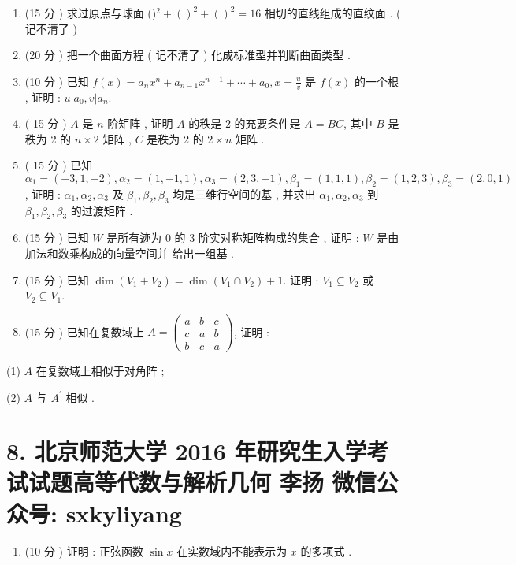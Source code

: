 \documentclass[10pt]{article}
\begin{document}
{\begin{enumerate}
  \item (15  分 )  求过原点与球面  ()$^{2}+()^{2}+()^{2}=16$  相切的直线组成的直纹面 . ( 记不清了 )

  \item (20  分 )  把一个曲面方程  ( 记不清了 )  化成标准型并判断曲面类型 .

  \item (10  分 )  已知  $f(x)=a_{n} x^{n}+a_{n-1} x^{n-1}+\cdots+a_{0}, x=\frac{u}{v}$  是  $f(x)$  的一个根 ,  证明 : $u\left|a_{0}, v\right| a_{n}$.

  \item ( 15  分 ) $A$  是  $n$  阶矩阵 ,  证明  $A$  的秩是  2  的充要条件是  $A=B C$,  其中  $B$  是秩为  2  的  $n \times 2$  矩阵 , $C$  是秩为  2  的  $2 \times n$  矩阵 .

  \item ( 15  分 )  已知  $\alpha_{1}=(-3,1,-2), \alpha_{2}=(1,-1,1), \alpha_{3}=(2,3,-1), \beta_{1}=(1,1,1), \beta_{2}=(1,2,3), \beta_{3}=(2,0,1)$,  证明 : $\alpha_{1}, \alpha_{2}, \alpha_{3}$  及  $\beta_{1}, \beta_{2}, \beta_{3}$  均是三维行空间的基 ,  并求出  $\alpha_{1}, \alpha_{2}, \alpha_{3}$  到  $\beta_{1}, \beta_{2}, \beta_{3}$  的过渡矩阵 .

  \item (15  分 )  已知  $W$  是所有迹为  0  的  3  阶实对称矩阵构成的集合 ,  证明 : $W$  是由加法和数乘构成的向量空间并   给出一组基 .

  \item (15  分 )  已知  $\operatorname{dim}\left(V_{1}+V_{2}\right)=\operatorname{dim}\left(V_{1} \cap V_{2}\right)+1$.  证明 : $V_{1} \subseteq V_{2}$  或  $V_{2} \subseteq V_{1}$.

  \item (15  分 )  已知在复数域上  $A=\left(\begin{array}{ccc}a & b & c \\ c & a & b \\ b & c & a\end{array}\right)$,  证明 :

\end{enumerate}
(1) $A$  在复数域上相似于对角阵 ;

(2) $A$  与  $A^{\prime}$  相似 .

\section{8. 北京师范大学 2016 年研究生入学考试试题高等代数与解析几何 
 李扬 
 微信公众号: sxkyliyang}
\begin{enumerate}
  \item (10  分 )  证明 :  正弦函数  $\sin x$  在实数域内不能表示为  $x$  的多项式 .


\end{enumerate}}
\end{document}
